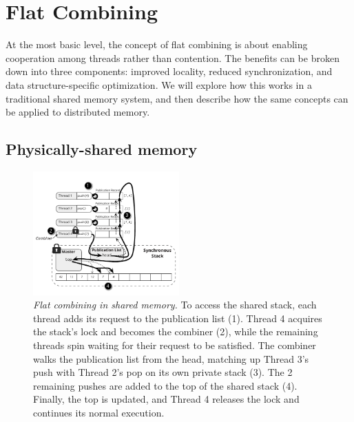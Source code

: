 \section{Flat Combining}

At the most basic level, the concept of flat combining is about enabling cooperation among threads rather than contention. The benefits can be broken down into three components: improved locality, reduced synchronization, and data structure-specific optimization. We will explore how this works in a traditional shared memory system, and then describe how the same concepts can be applied to distributed memory.


\subsection{Physically-shared memory}

\begin{figure}[t]
  \centering
  \includegraphics[width=0.5\textwidth]{figs/fc_shared_mem.pdf}
  \caption{\emph{Flat combining in shared memory.}
    To access the shared stack, each thread adds its request to the publication list (1). Thread 4 acquires the stack's lock and becomes the combiner (2), while the remaining threads spin waiting for their request to be satisfied. The combiner walks the publication list from the head, matching up Thread 3's push with Thread 2's pop on its own private stack (3). The 2 remaining pushes are added to the top of the shared stack (4). Finally, the top is updated, and Thread 4 releases the lock and continues its normal execution.
  }
  \label{fig:fc_shared_mem}
\end{figure}

